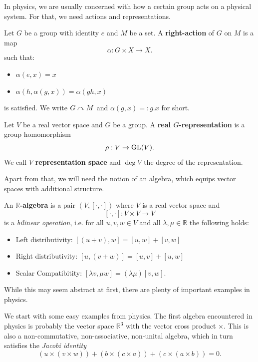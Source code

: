 In physics, we are usually concerned with how a certain group acts on a physical system. For that, we need actions and representations.
\begin{definition}
    Let $G$ be a group with identity $e$ and $M$ be a set. A \textbf{right-action} of $G$ on $M$ is a map \[
    \alpha: G \times X \to X
    .\] 
    such that:
    \begin{itemize}
        \item $\alpha(e,x) = x$
        \item $\alpha(h, \alpha(g,x))=\alpha(gh,x)$
    \end{itemize}
    is satisfied. We write $G \curvearrowright M$ and $\alpha(g,x)=:g.x$ for short.
\end{definition}
\begin{definition}[Representation]
    Let $V$ be a real vector space and $G$ be a group. A \textbf{real $G$-representation} is a group homomorphism \[
    \rho: V \to \operatorname{GL}(V)
    .\] 
    We call $V$ \textbf{representation space} and $\deg V$ the degree of the representation.
    
\end{definition}
Apart from that, we will need the notion of an algebra, which equips vector spaces with additional structure.
\begin{definition}[Algebra]
    An \textbf{$\mathbb{R}$-algebra} is a pair $(V,[\cdot,\cdot])$ where $V$ is a real vector space and \[
        [\cdot, \cdot]: V \times V \to V
    \] is a \emph{bilinear operation}, i.e. for all $u,v,w \in V$ and all $\lambda, \mu \in \mathbb{R}$ the following holds:
    \begin{itemize}
        \item Left distributivity: $[(u+v),w]=[u,w]+[v,w]$
        \item Right distributivity: $[u, (v+w)]=[u,v]+[u,w]$
        \item Scalar Compatibitity: $[\lambda v, \mu w]=(\lambda \mu)[v,w]$.
    \end{itemize}
\end{definition}
While this may seem abstract at first, there are plenty of important examples in physics. 
\begin{eg}
    We start with some easy examples from physics.
    The first algebra encountered in physics is probably the vector space $\mathbb{R}^3$ with the vector cross product $\times$. This is also a non-commutative, non-associative, non-unital algebra, which in turn satisfies the \emph{Jacobi identity} \[
                (u \times (v \times w))+(b \times (c \times a))+(c \times (a \times b))=0
        .\] 

\end{eg}
